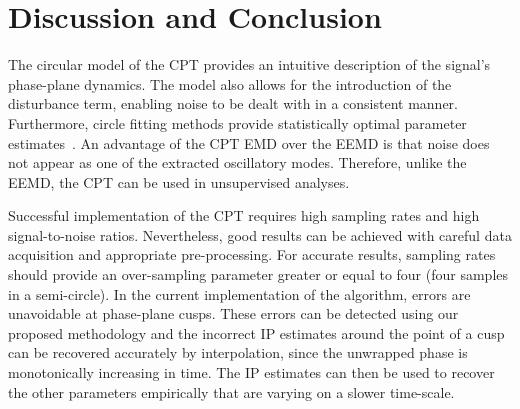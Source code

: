 \documentclass[a4paper]{IEEEtran}
\begin{document}
\section{Discussion and Conclusion}\label{sect:DiscussionSection}

The circular model of the CPT provides an intuitive description of the signal's phase-plane dynamics. The model also allows for the introduction of the disturbance term, enabling noise to be dealt with in a consistent manner. Furthermore, circle fitting methods provide statistically optimal parameter estimates~\cite{Al-Sharadqah2009}. An advantage of the CPT EMD over the EEMD is that noise does not appear as one of the extracted oscillatory modes. Therefore, unlike the EEMD, the CPT can be used in unsupervised analyses. %

 
Successful implementation of the CPT requires high sampling rates and high signal-to-noise ratios. Nevertheless, good results can be achieved with careful data acquisition and appropriate pre-processing. For accurate results, sampling rates should provide an over-sampling parameter greater or equal to four (four samples in a semi-circle). In the current implementation of the algorithm, errors are unavoidable at phase-plane cusps. These errors can be detected using our proposed methodology and the incorrect IP estimates around the point of a cusp can be recovered accurately by interpolation, since the unwrapped phase is monotonically increasing in time. The IP estimates can then be used to recover the other parameters empirically that are varying on a slower time-scale. 
\end{document}
